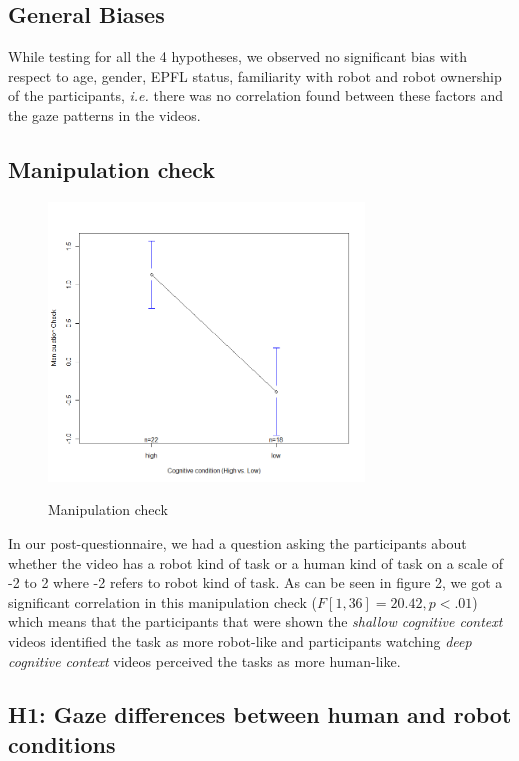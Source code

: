 \documentclass[lettersize, apacite, twoside, HRI]{apa_HRI}
\newcommand{\ie}{\textit{i.e.}\xspace}
\begin{document}
\subsection{General Biases}

While testing for all the 4 hypotheses, we observed no significant bias with
respect to age, gender, EPFL status, familiarity with robot and robot ownership
of the participants, \ie there was no correlation found between these factors
and the gaze patterns in the videos.

\subsection{Manipulation check}

\begin{figure}
    {\includegraphics[width=3.3in]{ManipulationCheck}}
    \caption{Manipulation check}
    \label{fig:ManipulationCheck}
\end{figure}


In our post-questionnaire, we had a question asking the participants about
whether the video has a robot kind of task or a human kind of task on a scale of
-2 to 2 where -2 refers to robot kind of task. As can be seen in figure 2, we
got a significant correlation in this manipulation check ($F[1,36] = 20.42, p <
.01$) which means that the participants that were shown the \emph{shallow
cognitive context} videos identified the task as more robot-like and
participants watching \emph{deep cognitive context} videos perceived the tasks
as more human-like. 


\subsection{H1: Gaze differences between human and robot conditions}
\end{document}
